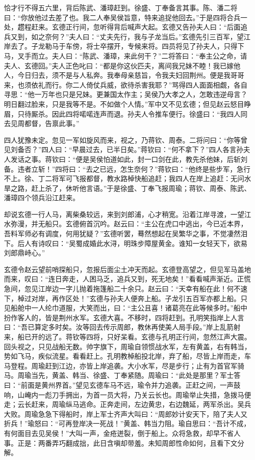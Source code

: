 恰才行不得五六里，背后陈武、潘璋赶到。徐盛、丁奉备言其事。陈、潘二将曰：“你放他过去差了也。我二人奉吴侯旨意，特来追捉他回去。”于是四将合兵一处，趱程赶来。玄德正行间，忽听得背后喊声大起。玄德又告孙夫人曰：“后面追兵又到，如之奈何？”夫人曰：“丈夫先行，我与子龙当后。”玄德先引三百军，望江岸去了。子龙勒马于车傍，将士卒摆开，专候来将。四员将见了孙夫人，只得下马，叉手而立。夫人曰：“陈武、潘璋，来此何干？”二将答曰：“奉主公之命，请夫人、玄德回。”夫人正色叱曰：“都是你这伙匹夫，离间我兄妹不睦！我已嫁他人，今日归去，须不是与人私奔。我奉母亲慈旨，令我夫妇回荆州。便是我哥哥来，也须依礼而行。你二人倚仗兵威，欲待杀害我耶？”骂得四人面面相觑，各自寻思：“他一万年也只是兄妹。更兼国太作主；吴侯乃大孝之人，怎敢违逆母言？明日翻过脸来，只是我等不是。不如做个人情。”军中又不见玄德；但见赵云怒目睁眉，只待厮杀。因此四将喏喏连声而退。孙夫人令推车便行。徐盛曰：“我四人同去见周都督，告禀此事。”

四人犹豫未定。忽见一军如旋风而来，视之，乃蒋钦、周泰。二将问曰：“你等曾见刘备否？”四人曰：“早晨过去，已半日矣。”蒋钦曰：“何不拿下？”四人各言孙夫人发话之事。蒋钦曰：“便是吴侯怕道如此，封一口剑在此，教先杀他妹，后斩刘备。违者立斩！”四将曰：“去之已远，怎生奈何？”蒋钦曰：“他终是些步军，急行不上。徐、丁二将军可飞报都督，教水路棹快船追赶；我四人在岸上追赶：无问水旱之路，赶上杀了，休听他言语。”于是徐盛、丁奉飞报周瑜；蒋钦、周泰、陈武、潘璋四个领兵沿江赶来。

却说玄德一行人马，离柴桑较远，来到刘郎浦，心才稍宽。沿着江岸寻渡，一望江水弥漫，并无船只。玄德俯首沉吟。赵云曰：“主公在虎口中逃出，今已近本界，吾料军师必有调度，何用犹疑？”玄德听罢，蓦然想起在吴繁华之事，不觉凄然泪下。后人有诗叹曰：“吴蜀成婚此水浔，明珠步障屋黄金。谁知一女轻天下，欲易刘郎鼎峙心。”

玄德令赵云望前哨探船只，忽报后面尘土冲天而起。玄德登高望之，但见军马盖地而来，叹曰：“连日奔走，人困马乏，追兵又到，死无地矣！”看看喊声渐近。正慌急间，忽见江岸边一字儿抛着拖篷船二十余只。赵云曰：“天幸有船在此！何不速下，棹过对岸，再作区处！”玄德与孙夫人便奔上船。子龙引五百军亦都上船。只见船舱中一人纶巾道服，大笑而出，曰：“主公且喜！诸葛亮在此等候多时。”船中扮作客人的，皆是荆州水军。玄德大喜。不移时，四将赶到。孔明笑指岸上人言曰：“吾已算定多时矣。汝等回去传示周郎，教休再使美人局手段。”岸上乱箭射来，船已开的远了。蒋钦等四将，只好呆看。玄德与孔明正行间，忽然江声大震。回头视之，只见战船无数。帅字旗下，周瑜自领惯战水军，左有黄盖，右有韩当，势如飞马，疾似流星。看看赶上。孔明教棹船投北岸，弃了船，尽皆上岸而走，车马登程。周瑜赶到江边，亦皆上岸追袭。大小水军，尽是步行；止有为首官军骑马。周瑜当先，黄盖、韩当、徐盛、丁奉紧随。周瑜曰：“此处是那里？军士答曰：“前面是黄州界首。”望见玄德车马不远，瑜令并力追袭。正赶之间，一声鼓响，山崦内一彪刀手拥出，为首一员大将，乃关云长也。周瑜举止失措，急拨马便走；云长赶来，周瑜纵马逃命。正奔走间，左边黄忠，右边魏延，两军杀出。吴兵大败。周瑜急急下得船时，岸上军士齐声大叫曰：“周郎妙计安天下，陪了夫人又折兵！”瑜怒曰：“可再登岸决一死战！”黄盖、韩当力阻。瑜自思曰：“吾计不成，有何面目去见吴侯！”大叫一声，金疮迸裂，倒于船上。众将急救，却早不省人事。正是：两番弄巧翻成拙，此日含嗔却带羞。未知周郎性命如何，且看下文分解。